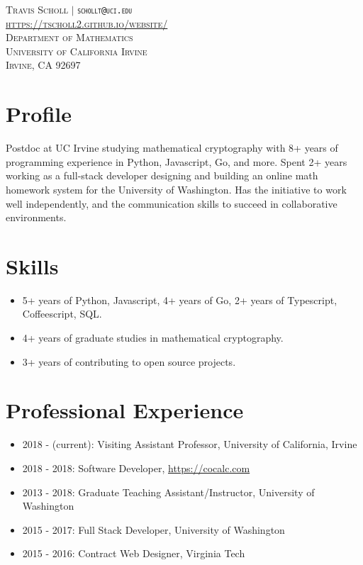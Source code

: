 \documentclass{article}
\begin{document}
	\vspace*{-1.5in}

	\begin{center}
	\textsc{
		Travis Scholl $\vert$ {\tt schollt@uci.edu} \\ \url{https://tscholl2.github.io/website/} \\
		Department of Mathematics \\
		University of California Irvine \\
		Irvine, CA 92697
	}
	\end{center}

	\section{Profile}

	Postdoc at UC Irvine studying mathematical cryptography with 8+ years of programming experience in Python, Javascript, Go, and more. Spent 2+ years working as a full-stack developer designing and building an online math homework system for the University of Washington. Has the initiative to work well independently, and the communication skills to succeed in collaborative environments.

	\section{Skills}

	\begin{itemize}
		\item 5+ years of Python, Javascript, 4+ years of Go, 2+ years of Typescript, Coffeescript, SQL.
		\item 4+ years of graduate studies in mathematical cryptography.
		\item 3+ years of contributing to open source projects.
	\end{itemize}

	\section{Professional Experience}

	\begin{itemize}
		\item 2018 - (current): Visiting Assistant Professor, University of California, Irvine
		\item 2018 - 2018: Software Developer, \url{https://cocalc.com}
		\item 2013 - 2018: Graduate Teaching Assistant/Instructor, University of Washington
		\item 2015 - 2017: Full Stack Developer, University of Washington
		\item 2015 - 2016: Contract Web Designer, Virginia Tech
	\end{itemize}
\end{document}
